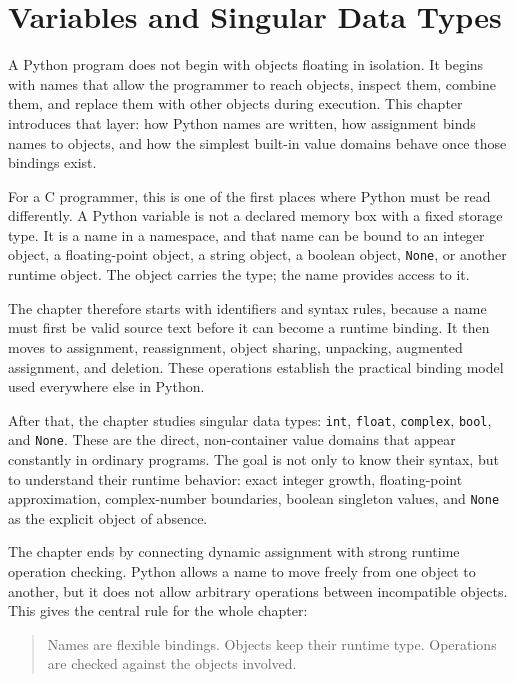\chapter{Variables and Singular Data Types}

A Python program does not begin with objects floating in isolation. It begins with names that allow the programmer to reach objects, inspect them, combine them, and replace them with other objects during execution. This chapter introduces that layer: how Python names are written, how assignment binds names to objects, and how the simplest built-in value domains behave once those bindings exist.

For a C programmer, this is one of the first places where Python must be read differently. A Python variable is not a declared memory box with a fixed storage type. It is a name in a namespace, and that name can be bound to an integer object, a floating-point object, a string object, a boolean object, \texttt{None}, or another runtime object. The object carries the type; the name provides access to it.

The chapter therefore starts with identifiers and syntax rules, because a name must first be valid source text before it can become a runtime binding. It then moves to assignment, reassignment, object sharing, unpacking, augmented assignment, and deletion. These operations establish the practical binding model used everywhere else in Python.

After that, the chapter studies singular data types: \texttt{int}, \texttt{float}, \texttt{complex}, \texttt{bool}, and \texttt{None}. These are the direct, non-container value domains that appear constantly in ordinary programs. The goal is not only to know their syntax, but to understand their runtime behavior: exact integer growth, floating-point approximation, complex-number boundaries, boolean singleton values, and \texttt{None} as the explicit object of absence.

The chapter ends by connecting dynamic assignment with strong runtime operation checking. Python allows a name to move freely from one object to another, but it does not allow arbitrary operations between incompatible objects. This gives the central rule for the whole chapter:

\begin{quote}
Names are flexible bindings. Objects keep their runtime type. Operations are checked against the objects involved.
\end{quote}